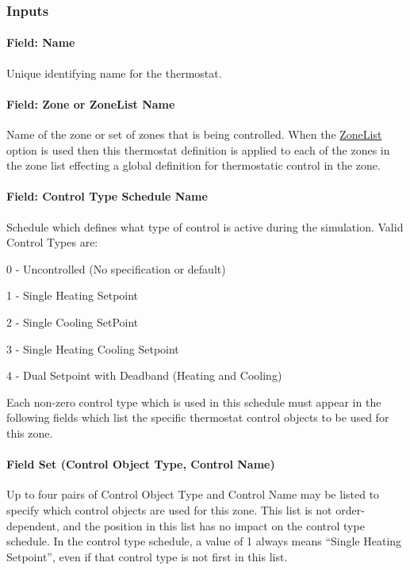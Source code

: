 \subsubsection{Inputs}\label{inputs-054}

\paragraph{Field: Name}\label{field-name-052}

Unique identifying name for the thermostat.

\paragraph{Field: Zone or ZoneList Name}\label{field-zone-or-zonelist-name-001}

Name of the zone or set of zones that is being controlled. When the \hyperref[zonelist]{ZoneList} option is used then this thermostat definition is applied to each of the zones in the zone list effecting a global definition for thermostatic control in the zone.

\paragraph{Field: Control Type Schedule Name}\label{field-control-type-schedule-name}

Schedule which defines what type of control is active during the simulation. Valid Control Types are:

0 - Uncontrolled (No specification or default)

1 - Single Heating Setpoint

2 - Single Cooling SetPoint

3 - Single Heating Cooling Setpoint

4 - Dual Setpoint with Deadband (Heating and Cooling)

Each non-zero control type which is used in this schedule must appear in the following fields which list the specific thermostat control objects to be used for this zone.

\paragraph{Field Set (Control Object Type, Control Name)}\label{field-set-control-object-type-control-name}

Up to four pairs of Control Object Type and Control Name may be listed to specify which control objects are used for this zone. This list is not order-dependent, and the position in this list has no impact on the control type schedule. In the control type schedule, a value of 1 always means ``Single Heating Setpoint'', even if that control type is not first in this list.

